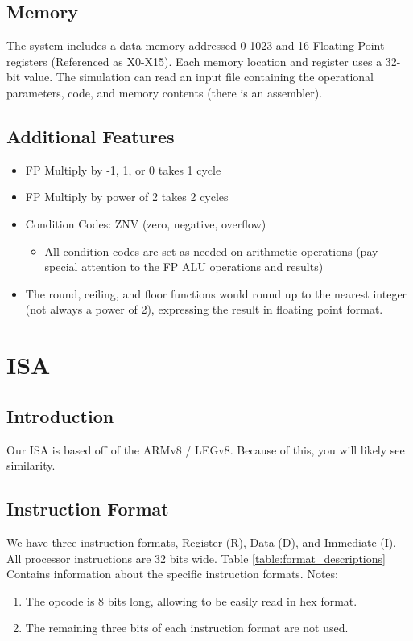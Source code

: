 \documentclass[a4paper,14pt]{article}
\begin{document}
\subsection{Memory}
The system includes a data memory addressed 0-1023 and 16 Floating Point registers (Referenced as X0-X15). Each memory location and register uses a 32-bit value. The simulation can read an input file containing the operational parameters, code, and memory contents (there is an assembler).
\subsection{Additional Features}
\begin{itemize}
    \setlength{\parskip}{0pt}
    \setlength{\itemsep}{0pt plus 1pt}
    \item FP Multiply by -1, 1, or 0 takes 1 cycle
    \item FP Multiply by power of 2 takes 2 cycles
    \item Condition Codes: ZNV (zero, negative, overflow)
    \begin{itemize}
        \setlength{\parskip}{0pt}
        \setlength{\itemsep}{0pt plus 1pt}
        \item All condition codes are set as needed on arithmetic operations (pay special attention to the FP ALU operations and results)
    \end{itemize}
    \item The round, ceiling, and floor functions would round up to the nearest integer (not always a power of 2), expressing the result in floating point format.
\end{itemize}

\section{ISA}
\subsection{Introduction}
Our ISA is based off of the ARMv8 / LEGv8. Because of this, you will likely see similarity.

\subsection{Instruction Format}
We have three instruction formats, Register (R), Data (D), and Immediate (I). 
All processor instructions are 32 bits wide. Table \ref{table:format_descriptions} Contains information about the specific instruction formats.
\newline
Notes:
\begin{enumerate}
    \item The opcode is 8 bits long, allowing to be easily read in hex format.
    \item The remaining three bits of each instruction format are not used.
\end{enumerate}
\end{document}
